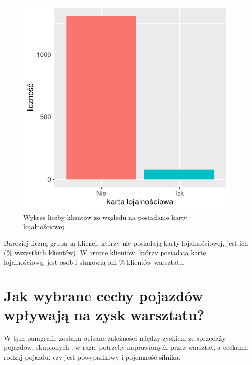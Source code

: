 \documentclass{article}\usepackage[]{graphicx}\usepackage[]{xcolor}
\makeatletter
\def\maxwidth{ %
  \ifdim\Gin@nat@width>\linewidth
    \linewidth
  \else
    \Gin@nat@width
  \fi
}
\newenvironment{knitrout}{}{} %
\makeatother
\begin{document}
\begin{knitrout}
\color{fgcolor}\begin{figure}[H]

{\centering \includegraphics[width=\maxwidth]{figure/fig_karta-1} 

}

\caption[Wykres liczby klientów ze względu na posiadanie karty lojalnościowej]{Wykres liczby klientów ze względu na posiadanie karty lojalnościowej}\label{fig:fig_karta}
\end{figure}

\end{knitrout}

Bardziej liczną grupą są klienci, którzy nie posiadają karty lojalnościowej, jest ich  (\% wszystkich klientów). W grupie klientów, którzy posiadają kartę lojalnościową, jest  osób i stanowią oni \% klientów warsztatu.

\section{Jak wybrane cechy pojazdów wpływają na zysk warsztatu?}

W tym paragrafie zostaną opisane zależności między zyskiem ze sprzedaży pojazdów, skupionych i w razie potrzeby naprawionych przez warsztat, a cechami: rodzaj pojazdu, czy jest powypadkowy i pojemność silnika.
\end{document}
